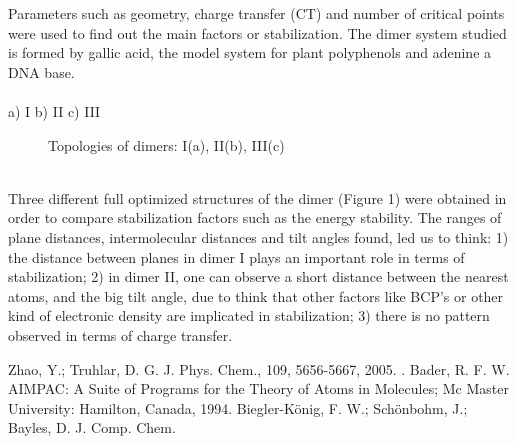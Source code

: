 Parameters such as geometry, charge transfer (CT) and number of critical
points were used to find out the main factors or stabilization. The dimer system
studied is formed by gallic acid, the model system for plant polyphenols and adenine
a DNA base.
\\
\\
a) I\hspace{3.3cm} b) II\hspace{5.5cm} c) III
\begin{figure}[h]
 {}
 {}
 {}
 \caption[]{ Topologies of dimers: I(a), II(b), III(c) }\label{figure 1}
\end{figure}
\\
\noindent
Three different full optimized structures of the dimer (Figure 1) were obtained
in order to compare stabilization factors such as the energy stability.
The ranges of plane distances, intermolecular distances and tilt angles found,
led us to think: 1) the distance between planes in dimer I plays an important role in
terms of stabilization; 2) in dimer II, one can observe a short distance between the
nearest atoms, and the big tilt angle, due to think that other factors like BCP’s or
other kind of electronic density are implicated in stabilization; 3) there is no pattern
observed in terms of charge transfer.

\newpage
\begin{figure}[h]
 {}
\end{figure}
{\footnotesize
\noindent
[1] Zhao, Y.; Truhlar, D. G. J. Phys. Chem., 109, 5656-5667, 2005.
\newline
[2]. Bader, R. F. W. AIMPAC: A Suite of Programs for the Theory of Atoms in
Molecules; Mc Master University: Hamilton, Canada, 1994.
\newline
[3] Biegler-König, F. W.; Schönbohm, J.; Bayles, D. J. Comp. Chem.
}
\newpage
\setcounter{figure}{0}
